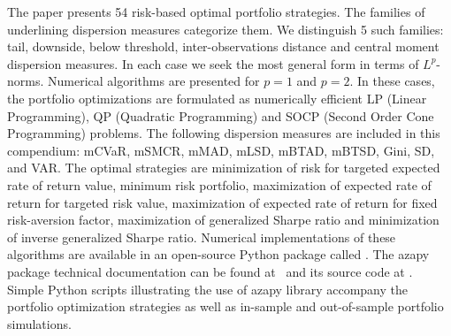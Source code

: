

The paper presents 54 risk-based optimal portfolio strategies. The families of underlining dispersion measures categorize them. We distinguish 5 such families: tail, downside, below threshold, inter-observations distance and central moment dispersion measures. In each case we seek the most general form in terms of $L^p$-norms. Numerical algorithms are presented for $p=1$ and $p=2$. In these cases, the portfolio optimizations are formulated as numerically efficient LP (Linear Programming), QP (Quadratic Programming) and SOCP (Second Order Cone Programming) problems. The following dispersion measures are included in this compendium: mCVaR, mSMCR, mMAD, mLSD, mBTAD, mBTSD, Gini, SD, and VAR. The optimal strategies are minimization of risk for targeted expected rate of return value, minimum risk portfolio, maximization of expected rate of return for targeted risk value, maximization of expected rate of return for fixed risk-aversion factor, maximization of generalized Sharpe ratio and minimization of inverse generalized Sharpe ratio. Numerical implementations of these algorithms are available in an open-source Python package called \azapy. The azapy package technical documentation can be found at \azapydoc\ and its source code at \azapycode. Simple Python scripts illustrating the use of azapy library accompany the portfolio optimization strategies as well as in-sample and out-of-sample portfolio simulations.
